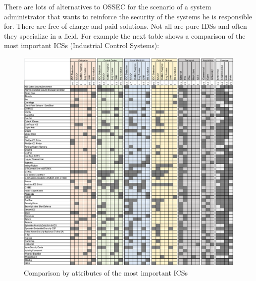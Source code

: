 \linej
There are lots of alternatives to OSSEC for the scenario of a system administrator that wants to reinforce the security of the systems he is responsible for. There are free of charge and paid solutions. Not all are pure IDSs and often they specialize in a field. For example the next table shows a comparison of the most important ICSs (Industrial Control Systems):
\begin{figure}[H]
  \centering
	\includegraphics[width=\textwidth]{figuras/comparison_ics.png}
	\caption{Comparison by attributes of the most important ICSs\cite{comparison_ics}}
\end{figure}


